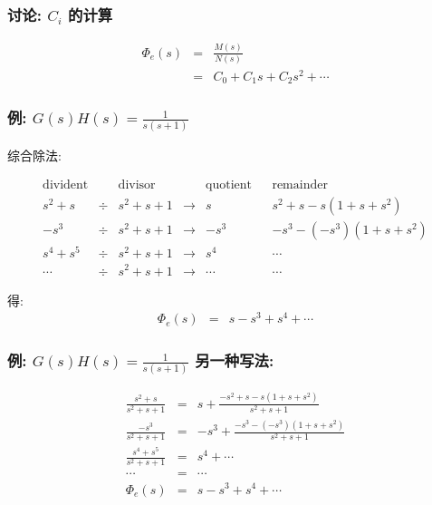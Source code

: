\documentclass{article}
\begin{document}
\begin{frame}
\frametitle{讨论: $C_i$ 的计算}
\label{sec-3-3-4}

\begin{eqnarray*}
\Phi_e(s) &=& \frac{M(s)}{N(s)} \\
 & = & C_0+C_1s+C_2s^2+\cdots
\end{eqnarray*}
\end{frame}
\begin{frame}
\frametitle{例: $G(s)H(s)=\frac{1}{s(s+1)}$}
\label{sec-3-3-5}


综合除法:

\[
\begin{matrix}
\text{divident}      &      &   \text{divisor}  &    & \text{quotient} &   & \text{remainder} \\  
s^2+s             &\div  &    s^2+s+1     & \rightarrow &  s       &  & s^2+s-s(1+s+s^2) \\
-s^3             &\div  &   s^2+s+1       & \rightarrow  & -s^3     &   & -s^3-(-s^3)(1+s+s^2)\\
 s^4+s^5         &\div  &  s^ 2+s+1       & \rightarrow & s^4  &   & \cdots  \\
\cdots           &\div   &  s^2+s+1       &\rightarrow  & \cdots   &    &\cdots   
\end{matrix}
\]

得:
\begin{eqnarray*}
\Phi_e(s)  &=& s-s^3+s^4+\cdots
\end{eqnarray*}
\end{frame}
\begin{frame}
\frametitle{例: $G(s)H(s)=\frac{1}{s(s+1)}$ 另一种写法:}
\label{sec-3-3-6}


\begin{eqnarray*}
\frac{s^2+s}{s^2+s+1} & = & s + \frac{-s^2+s-s(1+s+s^2)}{s^2+s+1}  \\
\frac{-s^3}{s^2+s+1}  & = & -s^3+\frac{-s^3-(-s^3)(1+s+s^2)}{s^2+s+1}\\
\frac{s^4+s^5}{s^2+s+1} &=& s^4 +\cdots \\
\cdots                  &=& \cdots \\
\Phi_e(s)               &=& s-s^3+s^4+\cdots
\end{eqnarray*}
\end{frame}
\end{document}
